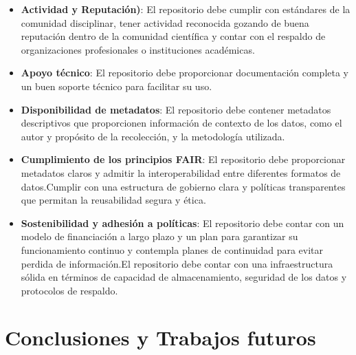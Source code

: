 \documentclass[runningheads]{llncs}
\def \echregi {\end{color}}
\def \bchedel {\begin{color}{cyan}}
\def \echedel {\end{color}}
\begin{document}
\begin{itemize}
    \item \textbf{Actividad y Reputación)}: El repositorio debe cumplir con estándares de la comunidad disciplinar, tener actividad reconocida  gozando de buena reputación dentro de la comunidad científica y contar con el respaldo de organizaciones profesionales o instituciones académicas.
    \item \textbf{Apoyo técnico}: El repositorio debe proporcionar documentación completa y un buen soporte técnico para facilitar su uso.
    \item \textbf{Disponibilidad de metadatos}:  El repositorio debe contener metadatos descriptivos que proporcionen información de contexto de los datos, como el autor y propósito de la recolección, y la metodología utilizada. 
    \item \textbf{Cumplimiento de los principios FAIR}: El repositorio debe proporcionar metadatos claros y admitir la interoperabilidad entre diferentes formatos de datos.Cumplir  con una estructura de gobierno clara y políticas transparentes que permitan la reusabilidad segura y ética.
    \item \textbf{Sostenibilidad y adhesión a políticas}: El repositorio debe contar con un modelo de financiación a largo plazo y un plan para garantizar su funcionamiento continuo y contempla planes de continuidad para evitar perdida de información.El repositorio debe contar con una infraestructura sólida en términos de capacidad de almacenamiento, seguridad de los datos y protocolos de respaldo.
\end{itemize}




\section{Conclusiones y Trabajos futuros}

\end{document}
